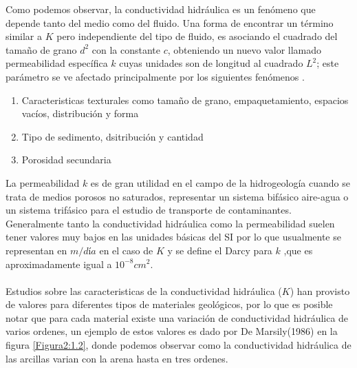 Como podemos observar, la conductividad hidráulica es un fenómeno que depende tanto del medio como del fluido. Una forma de encontrar un término similar a $K$ pero independiente del tipo de fluido, es asociando el cuadrado del tamaño de grano $d^{2}$ con la constante $c$, obteniendo un nuevo valor llamado permeabilidad específica $k$ cuyas unidades son de longitud al cuadrado $L^{2}$; este parámetro se ve afectado principalmente por los siguientes fenómenos \cite{Sen2015} .

\begin{enumerate}
\item Caracteristicas texturales como tamaño de grano, empaquetamiento, espacios vacíos, distribución y forma  
\item Tipo de sedimento, dsitribución y cantidad
\item Porosidad secundaria
\end{enumerate}

La permeabilidad $k$ es de gran utilidad en el campo de la hidrogeología cuando se trata de medios porosos no saturados, representar un sistema bifásico aire-agua o un sistema trifásico para el estudio de transporte de contaminantes. Generalmente tanto la conductividad hidráulica como la permeabilidad suelen tener valores muy bajos en las unidades básicas del SI por lo que usualmente se representan en $m/día$ en el caso de $K$ y se define el Darcy para $k$ ,que es aproximadamente igual a $10^{-8} cm^{2}$.
\\
\\
Estudios sobre las caracteristicas de la conductividad hidráulica ($K$) han provisto de valores para diferentes tipos de materiales geológicos, por lo que es posible notar que para cada material existe una variación de conductividad hidráulica de varios ordenes, un ejemplo de estos valores es dado por De Marsily(1986) en la figura \ref{Figura2:1.2}, donde podemos observar como la conductividad hidráulica de las arcillas varian con la arena hasta en tres ordenes\cite{Freeze1979}\cite{Marsily1986}.

